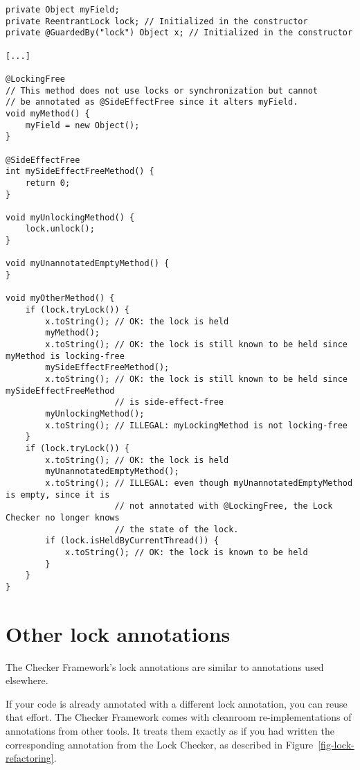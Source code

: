 \begin{verbatim}
private Object myField;
private ReentrantLock lock; // Initialized in the constructor
private @GuardedBy("lock") Object x; // Initialized in the constructor
 
[...]
 
@LockingFree
// This method does not use locks or synchronization but cannot
// be annotated as @SideEffectFree since it alters myField.
void myMethod() {
    myField = new Object();
}

@SideEffectFree
int mySideEffectFreeMethod() {
    return 0;
}

void myUnlockingMethod() {
    lock.unlock();
}

void myUnannotatedEmptyMethod() {
}

void myOtherMethod() {
    if (lock.tryLock()) {
        x.toString(); // OK: the lock is held
        myMethod();
        x.toString(); // OK: the lock is still known to be held since myMethod is locking-free
        mySideEffectFreeMethod();
        x.toString(); // OK: the lock is still known to be held since mySideEffectFreeMethod
                      // is side-effect-free
        myUnlockingMethod();
        x.toString(); // ILLEGAL: myLockingMethod is not locking-free
    }
    if (lock.tryLock()) {
        x.toString(); // OK: the lock is held
        myUnannotatedEmptyMethod();
        x.toString(); // ILLEGAL: even though myUnannotatedEmptyMethod is empty, since it is
                      // not annotated with @LockingFree, the Lock Checker no longer knows
                      // the state of the lock.
        if (lock.isHeldByCurrentThread()) {
            x.toString(); // OK: the lock is known to be held
        }
    }
}
\end{verbatim}

\section{Other lock annotations\label{other-lock-annotations}}

The Checker Framework's lock annotations are similar to annotations used
elsewhere.

If your code is already annotated with a different lock
annotation, you can reuse that effort.  The Checker Framework comes with
cleanroom re-implementations of annotations from other tools.  It treats
them exactly as if you had written the corresponding annotation from the
Lock Checker, as described in Figure~\ref{fig-lock-refactoring}.



